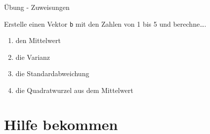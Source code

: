 \documentclass[ignorenonframetext,]{beamer}
\begin{document}
\begin{frame}[fragile]{Übung - Zuweisungen}

Erstelle einen Vektor \texttt{b} mit den Zahlen von 1 bis 5 und
berechne\ldots{}.

\begin{enumerate}
\def\labelenumi{\arabic{enumi}.}
\item
  den Mittelwert
\item
  die Varianz
\item
  die Standardabweichung
\item
  die Quadratwurzel aus dem Mittelwert
\end{enumerate}

\end{frame}

\section{Hilfe bekommen}\label{hilfe-bekommen}
\end{document}

